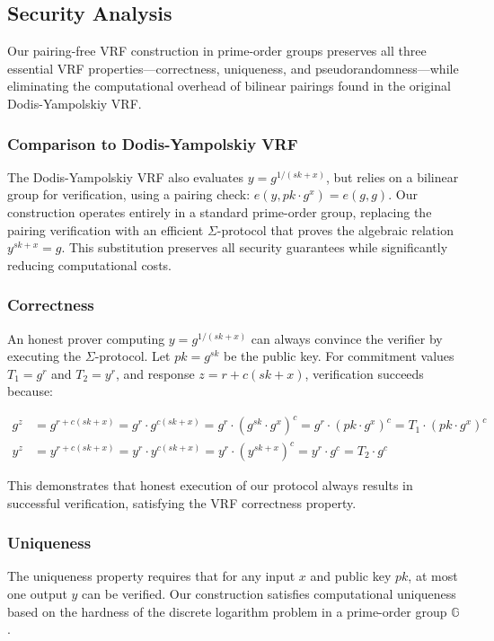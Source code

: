 \subsection{Security Analysis}

Our pairing-free VRF construction in prime-order groups preserves all three essential VRF properties—correctness, uniqueness, and pseudorandomness—while eliminating the computational overhead of bilinear pairings found in the original Dodis-Yampolskiy VRF.

\subsubsection{Comparison to Dodis-Yampolskiy VRF}
The Dodis-Yampolskiy VRF also evaluates $y = g^{1/(sk + x)}$, but relies on a bilinear group for verification, using a pairing check: $e(y, pk \cdot g^x) = e(g, g)$. Our construction operates entirely in a standard prime-order group, replacing the pairing verification with an efficient $\Sigma$-protocol that proves the algebraic relation $y^{sk+x} = g$. This substitution preserves all security guarantees while significantly reducing computational costs.

\subsubsection{Correctness}
An honest prover computing $y = g^{1/(sk+x)}$ can always convince the verifier by executing the $\Sigma$-protocol. Let $pk = g^{sk}$ be the public key. For commitment values $T_1 = g^r$ and $T_2 = y^r$, and response $z = r + c(sk+x)$, verification succeeds because:

\begin{align}
g^z &= g^{r + c(sk+x)} = g^r \cdot g^{c(sk+x)} = g^r \cdot (g^{sk} \cdot g^x)^c = g^r \cdot (pk \cdot g^x)^c = T_1 \cdot (pk \cdot g^x)^c \\
y^z &= y^{r + c(sk+x)} = y^r \cdot y^{c(sk+x)} = y^r \cdot (y^{sk+x})^c = y^r \cdot g^c = T_2 \cdot g^c
\end{align}

This demonstrates that honest execution of our protocol always results in successful verification, satisfying the VRF correctness property.



\subsubsection{Uniqueness}
The uniqueness property requires that for any input $x$ and public key $pk$, at most one output $y$ can be verified. Our construction satisfies computational uniqueness based on the hardness of the discrete logarithm problem in a prime-order group $\mathbb{G}$.

